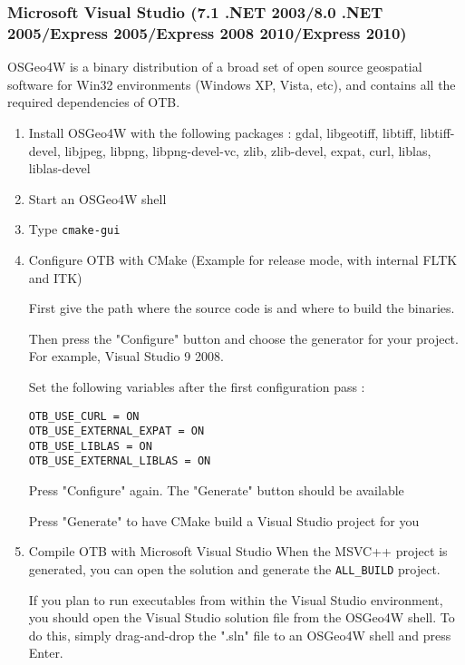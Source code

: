 \subsubsection{Microsoft Visual Studio (7.1 .NET 2003/8.0 .NET 2005/Express 2005/Express 2008 2010/Express 2010)}
OSGeo4W is a binary distribution of a broad set of open source geospatial software 
for Win32 environments (Windows XP, Vista, etc), and contains all the required dependencies of OTB.


\begin{enumerate}

\item Install OSGeo4W with the following packages : gdal, libgeotiff, libtiff, libtiff-devel, libjpeg, libpng, libpng-devel-vc, zlib, zlib-devel, expat, curl, liblas, liblas-devel

\item Start an OSGeo4W shell

\item Type \texttt{cmake-gui}

\item Configure OTB with CMake (Example for release mode, with internal FLTK and ITK)

    First give the path where the source code is and where to build the binaries.

    Then press the "Configure" button and choose the generator for your project. For example, Visual Studio 9 2008.

    Set the following variables after the first configuration pass :

        \texttt{OTB\_USE\_CURL = ON}\\
        \texttt{OTB\_USE\_EXTERNAL\_EXPAT = ON}\\
        \texttt{OTB\_USE\_LIBLAS = ON}\\
        \texttt{OTB\_USE\_EXTERNAL\_LIBLAS = ON}

    Press "Configure" again. The "Generate" button should be available

    Press "Generate" to have CMake build a Visual Studio project for you

\item Compile OTB with Microsoft Visual Studio
    When the MSVC++ project is generated, you can open the solution and generate the \texttt{ALL\_BUILD} project.

    If you plan to run executables from within the Visual Studio environment, you should open the Visual Studio solution file
    from the OSGeo4W shell. To do this, simply drag-and-drop the ".sln" file to an OSGeo4W shell and press Enter.

\end{enumerate}

